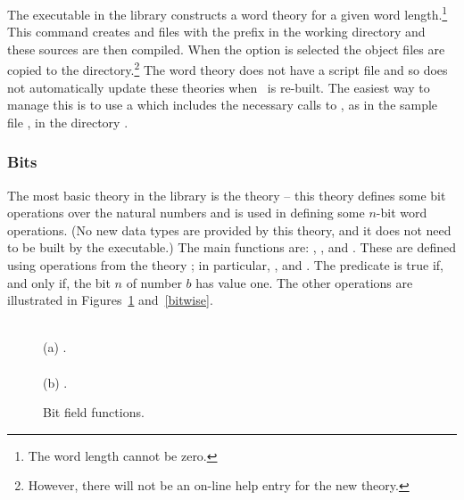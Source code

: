 {
The executable  in the  library constructs a
word theory for a given word length.\footnote{The word length cannot
  be zero.}  This command creates  and 
files with the prefix  in the working
directory and these sources are then compiled. When the 
option is selected the object files are copied to the 
directory.\footnote{However, there will not be an on-line help entry
  for the new theory.}  The word theory does not have a script file
and so  does not automatically update these theories \eg{}
when \HOL\ is re-built.  The easiest way to manage this is to use a
 which includes the necessary calls to
, as in the sample file , in
the directory .


\subsubsection{Bits}
\label{bits}

The most basic theory in the library is the theory  -- this
theory defines some bit operations over the natural numbers and is
used in defining some $n$-bit word operations.  (No new data types are
provided by this theory, and it does not need to be built by the
 executable.)  The main functions are: ,
,  and .  These are defined
using operations from the theory ; in
particular, ,  and .  The
predicate  is true if, and only if, the bit $n$ of
number $b$ has value one.  The other operations are illustrated in
Figures~\ref{bits-slice} and~\ref{bitwise}.
%
%
%
%

\begin{figure}
\begin{center}
 \\[3mm]
(a) . \\[6mm]
 \\[3mm]
(b) .
\end{center}
\caption{Bit field functions.\label{bits-slice}}
\end{figure}

}
